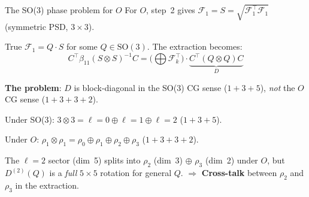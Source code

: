 \documentclass[aspectratio=169]{beamer}
\begin{document}
\begin{frame}{The SO(3) phase problem for $O$}
  For $O$, step~2 gives $\mathcal{F}_1 = S = \sqrt{\mathcal{F}_1^\top \mathcal{F}_1}$
  (symmetric PSD, $3\times 3$).

  \medskip

  True $\mathcal{F}_1 = Q \cdot S$ for some $Q \in \mathrm{SO}(3)$.
  The extraction becomes:
  \[
    C^\top \beta_{11} (S \otimes S)^{-1} C
    = \bigl(\bigoplus \mathcal{F}_k^\top\bigr) \cdot \underbrace{C^\top (Q \otimes Q) C}_{D}
  \]

  \bigskip

  \textbf{The problem}: $D$ is block-diagonal in the SO(3) CG sense ($1 + 3 + 5$),
  \emph{not} the $O$ CG sense ($1 + 3 + 3 + 2$).

  \medskip

  Under SO(3): $3 \otimes 3 = \ell{=}0 \oplus \ell{=}1 \oplus \ell{=}2$ \quad ($1 + 3 + 5$).

  Under $O$: $\rho_1 \otimes \rho_1 = \rho_0 \oplus \rho_1 \oplus \rho_2 \oplus \rho_3$ \quad ($1 + 3 + 3 + 2$).

  \medskip

  The $\ell{=}2$ sector (dim~5) splits into $\rho_2$ (dim~3) $\oplus$ $\rho_3$ (dim~2)
  under $O$, but $D^{(2)}(Q)$ is a \emph{full} $5\times 5$ rotation for general $Q$.
  $\Rightarrow$ \textbf{Cross-talk} between $\rho_2$ and $\rho_3$ in the extraction.
\end{frame}
\end{document}
